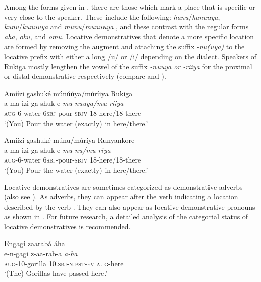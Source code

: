 \documentclass[output=paper 		  ]{langscibook}
\begin{document}
\largerpage
Among the forms given in , there are those which mark a place that is specific or very close to the speaker. These include the following: \textit{hanu}/\textit{hanuuya}, \textit{kunu}/\textit{kunuuya} and \textit{munu}/\textit{munuuya} , and these contrast with the regular forms \textit{aha,} \textit{oku,} and \textit{omu}. Locative demonstratives that denote a more specific location are formed by removing the augment and attaching the suffix -\textit{nu(uya)} to the locative prefix with either a long /u/ or /i/ depending on the dialect. Speakers of Rukiga mostly lengthen the vowel of the suffix \textit{{}-nuuya or -riiya} for the proximal or distal demonstrative respectively (compare  and ).

\ea%
    \label{ex:asiimwe:22}
    \ea\label{ex:asiimwe:22a}  Amíízi gashuké múnúúya/múríiya        Rukiga\\
    \gll a-ma-izi  ga-shuk-e  \emph{mu-nuuya/mu-riiya}\\
\textsc{aug}{}-6-water  6\textsc{sbj}-pour-\textsc{sbjv}  18-here/18-there\\
\glt ‘(You) Pour the water (exactly) in here/there.’

  \ex\label{ex:asiimwe:22b}   Amíízi gashuké múnu/múríya          Runyankore\\
    \gll a-ma-izi  ga-shuk-e  \emph{mu-nu/mu-riya}\\
\textsc{aug}{}-6-water  \textsc{6sbj-}pour-\textsc{sbjv}  18-here/18-there\\
\glt ‘(You) Pour the water (exactly) in here/there.’
    \z
\z

Locative demonstratives are sometimes categorized as demonstrative adverbs \citep{Dixon2003} (also see ). As adverbs, they can appear after the verb indicating a location described by the verb .  They can also appear as locative demonstrative pronouns as shown in .  For future research, a detailed analysis of the categorial status of locative demonstratives is recommended.

\ea%
    \label{ex:asiimwe:23} Engagi zaarabá áha\\
\gll e-n-gagi  z-aa-rab-a  \emph{a-ha}\\
  \textsc{aug}{}-10-gorilla  \textsc{10.sbj-n.pst-fv}  \textsc{aug}{}-here\\
\glt ‘(The) Gorillas have passed here.’
\z
\end{document}
